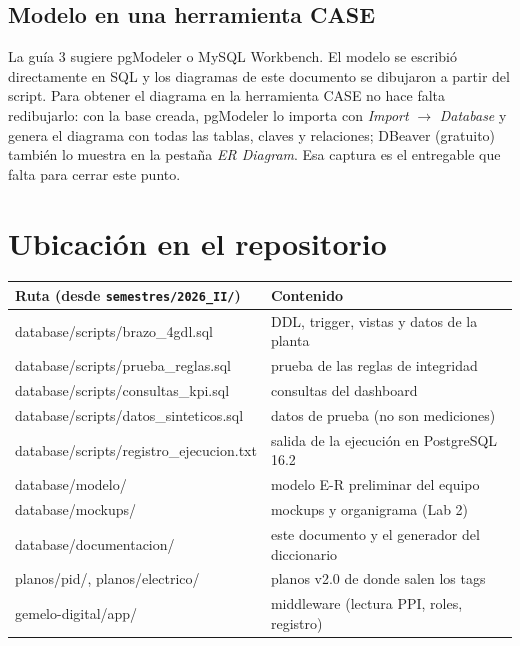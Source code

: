 \documentclass[a4paper,11pt]{article}
\begin{document}
\subsection{Modelo en una herramienta CASE}\label{sec:case}
La guía 3 sugiere pgModeler o MySQL Workbench. El modelo se escribió directamente en SQL y los diagramas de este documento se dibujaron a partir del script. Para obtener el diagrama en la herramienta CASE no hace falta redibujarlo: con la base creada, pgModeler lo importa con \emph{Import} $\to$ \emph{Database} y genera el diagrama con todas las tablas, claves y relaciones; DBeaver (gratuito) también lo muestra en la pestaña \emph{ER Diagram}. Esa captura es el entregable que falta para cerrar este punto.

\section{Ubicación en el repositorio}\label{sec:repo}
\begin{center}\small
\begin{tabularx}{\linewidth}{>{\ttfamily\raggedright}p{7.4cm} >{\raggedright\arraybackslash}X}
\toprule
\textrm{\textbf{Ruta (desde \texttt{semestres/2026\_II/})}} & \textbf{Contenido}\\
\midrule
database/scripts/brazo\_4gdl.sql & DDL, trigger, vistas y datos de la planta\\
database/scripts/prueba\_reglas.sql & prueba de las reglas de integridad\\
database/scripts/consultas\_kpi.sql & consultas del dashboard\\
database/scripts/datos\_sinteticos.sql & datos de prueba (no son mediciones)\\
database/scripts/registro\_ejecucion.txt & salida de la ejecución en PostgreSQL 16.2\\
database/modelo/ & modelo E-R preliminar del equipo\\
database/mockups/ & mockups y organigrama (Lab 2)\\
database/documentacion/ & este documento y el generador del diccionario\\
planos/pid/, planos/electrico/ & planos v2.0 de donde salen los tags\\
gemelo-digital/app/ & middleware (lectura PPI, roles, registro)\\
\bottomrule
\end{tabularx}
\end{center}
\end{document}
